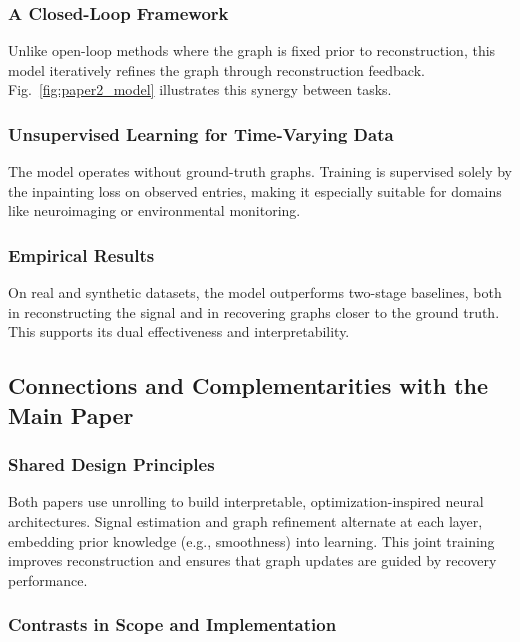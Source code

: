 \documentclass{article}
\theoremstyle{plain}
\theoremstyle{definition}
\theoremstyle{remark}
\begin{document}
\subsubsection{A Closed-Loop Framework}

Unlike open-loop methods where the graph is fixed prior to reconstruction, this model iteratively refines the graph through reconstruction feedback. Fig.~\ref{fig:paper2_model} illustrates this synergy between tasks.

\subsubsection{Unsupervised Learning for Time-Varying Data}

The model operates without ground-truth graphs. Training is supervised solely by the inpainting loss on observed entries, making it especially suitable for domains like neuroimaging or environmental monitoring.

\subsubsection{Empirical Results}

On real and synthetic datasets, the model outperforms two-stage baselines, both in reconstructing the signal and in recovering graphs closer to the ground truth. This supports its dual effectiveness and interpretability.

\subsection{Connections and Complementarities with the Main Paper}

\subsubsection{Shared Design Principles}

Both papers use unrolling to build interpretable, optimization-inspired neural architectures. Signal estimation and graph refinement alternate at each layer, embedding prior knowledge (e.g., smoothness) into learning. This joint training improves reconstruction and ensures that graph updates are guided by recovery performance.


\subsubsection{Contrasts in Scope and Implementation}
\end{document}
